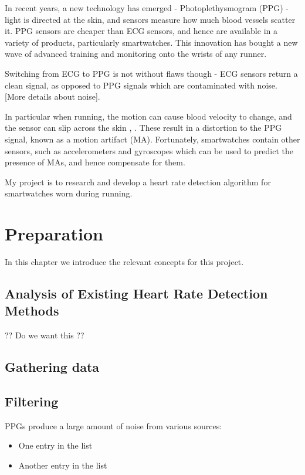 \documentclass[12pt,a4paper,twoside,openright]{report}
\begin{document}
In recent years, a new technology has emerged - Photoplethysmogram (PPG) 
- light is directed at the skin, and sensors measure how much blood vessels
scatter it. PPG sensors are cheaper than ECG sensors, and hence are 
available in a variety of products, particularly smartwatches. This 
innovation has bought a new wave of advanced training and monitoring onto
the wrists of any runner.

Switching from ECG to PPG is not without flaws though - ECG sensors return a
clean signal, as opposed to PPG signals which are contaminated with
noise. [More details about noise]. 

In particular when running, the motion can cause blood velocity to 
change, and the sensor can slip across the skin \cite{Wijshoff17}, 
\cite{Wood06}. These result in a distortion to the PPG signal, known as a
motion artifact (MA). Fortunately, smartwatches contain other sensors, such
as accelerometers and gyroscopes which can be used to predict the presence of 
MAs, and hence compensate for them.

My project is to research and develop a heart rate detection algorithm
for smartwatches worn during running. 

\chapter{Preparation}

In this chapter we introduce the relevant concepts for this project.


\section{Analysis of Existing Heart Rate Detection Methods}

?? Do we want this ??


\section{Gathering data}


\section{Filtering}

PPGs produce a large amount of noise from various sources:
\begin{itemize}
	\item One entry in the list
	\item Another entry in the list
\end{itemize}
\end{document}

